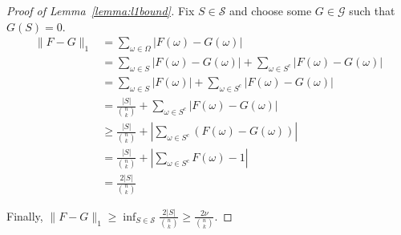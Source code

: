 \documentclass[12pt]{article}
\begin{document}
\begin{proof}[Proof of Lemma~\ref{lemma:l1bound}]
Fix $S \in \mathcal{S}$ and choose some $G \in \mathcal{G}$ such that $G(S) = 0$.
\begin{align*}
\lVert F - G \rVert_1 &= \sum_{\omega \in \Omega} \lvert F(\omega) - G(\omega) \rvert \\
&= \sum_{\omega \in S} \lvert F(\omega) - G(\omega) \rvert + \sum_{\omega \in S^c} \lvert F(\omega) - G(\omega) \rvert\\
&= \sum_{\omega \in S} \lvert F(\omega) \rvert + \sum_{\omega \in S^c} \lvert F(\omega) - G(\omega) \rvert\\
&= \frac{ \lvert S \rvert}{{n \choose k}}+ \sum_{\omega \in S^c} \lvert F(\omega) - G(\omega) \rvert\\
&\geq \frac{ \lvert S \rvert}{{n \choose k}}+ \left\lvert\sum_{\omega \in S^c} \left( F(\omega) - G(\omega) \right)\right\rvert\\
&= \frac{ \lvert S \rvert}{{n \choose k}}+ \left\lvert\sum_{\omega \in S^c} F(\omega) - 1 \right\rvert\\
&= \frac{2 \lvert S \rvert}{{n \choose k}}
\end{align*}

Finally, $ \lVert F - G \rVert_1 \geq \inf_{S \in \mathcal{S}} \frac{2 \lvert S \rvert}{{n \choose k}} \geq \frac{2\nu}{{n \choose k}}$.
\end{proof}
\end{document}
